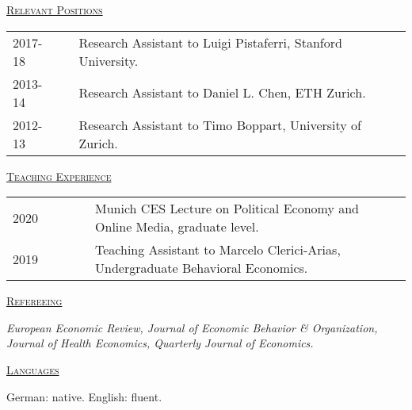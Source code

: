 \documentclass[letterpaper,11pt]{article}
\begin{document}
 \bigskip
 
\underline {\textsc{Relevant Positions}}

\begin{tabular}{@{}l@{}cl@{}cl}
2017-18 & & Research Assistant to Luigi Pistaferri, Stanford University. \\
2013-14 & & Research Assistant to Daniel L. Chen, ETH Zurich. \\
2012-13 & & Research Assistant to Timo Boppart, University of Zurich.
\end{tabular}

\bigskip
 
\underline {\textsc{Teaching Experience}}

\begin{tabular}{@{}l@{}cl@{}cl}
2020 & \ \ \ \ \ & Munich CES Lecture on Political Economy and Online Media, graduate level. \\
2019 & \ \ \ \ \ & Teaching Assistant to Marcelo Clerici-Arias, Undergraduate Behavioral Economics.
\end{tabular}

\bigskip
 
\underline {\textsc{Refereeing}}

\textit{European Economic Review, Journal of Economic Behavior \& Organization, Journal of Health Economics, Quarterly Journal of Economics.}

\bigskip
 
\underline {\textsc{Languages}}

German: native. English: fluent.
\end{document}
